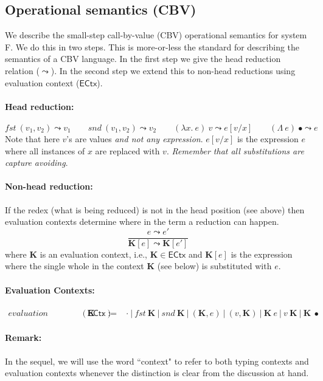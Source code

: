 \documentclass{article}
\newcommand{\gor}{~|~}
\newcommand{\fst}{\mathit{fst}}
\newcommand{\snd}{\mathit{snd}}
\newcommand{\ECTX}{\mathsf{ECtx}}
\newcommand{\ectx}{\mathbf{K}}
\begin{document}
\subsection{Operational semantics (CBV)}
We describe the small-step call-by-value (CBV) operational semantics for system F. We do this in two steps. This is more-or-less the standard for describing the semantics of a CBV language.
In the first step we give the head reduction relation ($\leadsto$).
In the second step we extend this to non-head reductions using
evaluation context ($\ECTX$).

\paragraph{Head reduction:}
\[
\fst~(v_1, v_2) \leadsto v_1 \hspace{2em}
\snd~(v_1, v_2) \leadsto v_2 \hspace{2em}
(\lambda x.~e)~v \leadsto e[v/x] \hspace{2em}
(\Lambda~e)~\bullet \leadsto e
\]
Note that here $v$'s are values \emph{and not any expression}.
$e[v/x]$ is the expression $e$ where all instances of $x$ are
replaced with $v$. \emph{Remember that all substitutions are capture avoiding}.
\paragraph{Non-head reduction:} If the redex (what is being reduced) is not in the head position (see above) then evaluation contexts determine where in the term a reduction can happen.
\[
\frac{e \leadsto e'}{\ectx[e] \leadsto \ectx[e']}
\]
where $\ectx$ is an evaluation context, i.e., $\ectx \in \ECTX$
and $\ectx[e]$ is the expression where the single whole in the context $\ectx$ (see below) is substituted with $e$.

\paragraph{Evaluation Contexts:}
\[
\begin{array}{llll}
\textit{evaluation contexts}(\ECTX) &\ectx &::=& \cdot
\gor \fst~\ectx \gor \snd~\ectx \gor (\ectx, e) \gor (v, \ectx)
\gor \ectx~e \gor v~\ectx \gor \ectx~\bullet
\end{array}
\]

\paragraph{Remark:} In the sequel, we will use the word ``context"
to refer to both typing contexts and evaluation contexts whenever
the distinction is clear from the discussion at hand.
\end{document}
